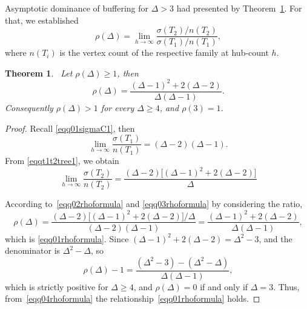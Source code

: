 \documentclass[12pt]{amsart}
\newtheorem{theorem}{Theorem}[section]
\begin{document}
\medskip




Asymptotic dominance of buffering for $\Delta>3$ had presented by Theorem~\ref{thm001bufferdominance}. For that, we established 
\begin{equation}~\label{eqqrhonm01}
\rho(\Delta) = \lim_{h\to\infty}\dfrac{\sigma(T_2)/n(T_2)}{\sigma(T_1)/n(T_1)},  
\end{equation}
where $n(T_i)$ is the vertex count of the respective family at hub-count $h$.

\begin{theorem}~\label{thm001bufferdominance}
Let $\rho(\Delta)\geqslant 1$, then
\begin{equation}~\label{eqq01rhoformula}
\rho(\Delta)=\frac{(\Delta-1)^2+2(\Delta-2)}{\Delta(\Delta-1)}.
\end{equation}
Consequently $\rho(\Delta)>1$ for every $\Delta\ge 4$, and $\rho(3)=1$.
\end{theorem}
\begin{proof}
Recall \eqref{eqq01sigmaC1}, then
\begin{equation}~\label{eqq02rhoformula}
 \lim_{h\to\infty}\dfrac{\sigma(T_1)}{n(T_1)}= (\Delta-2)(\Delta-1). 
\end{equation}
From \eqref{eqqt1t2tree1}, we obtain
\begin{equation}~\label{eqq03rhoformula}
 \lim_{h\to\infty}\dfrac{\sigma(T_2)}{n(T_2)}=\dfrac{(\Delta-2)\big[(\Delta-1)^2+2(\Delta-2)\big]}{\Delta} 
\end{equation}

According to~\eqref{eqq02rhoformula} and \eqref{eqq03rhoformula} by considering the ratio,
\begin{equation}~\label{eqq04rhoformula}
\rho(\Delta)=\frac{(\Delta-2)\big[(\Delta-1)^2+2(\Delta-2)\big]/\Delta}
{(\Delta-2)(\Delta-1)}=\frac{(\Delta-1)^2+2(\Delta-2)}{\Delta(\Delta-1)},
\end{equation}
which is \eqref{eqq01rhoformula}. Since $(\Delta-1)^2+2(\Delta-2) = \Delta^2-3$, and the denominator is $\Delta^2-\Delta$, so
\begin{equation}~\label{eqq01rhominus1}
\rho(\Delta)-1 = \frac{(\Delta^2-3)-(\Delta^2-\Delta)}{\Delta(\Delta-1)},
\end{equation}
which is strictly positive for $\Delta\geqslant 4$, and  $\rho(\Delta)=0$ if and only if $\Delta=3$. Thus, from~\eqref{eqq04rhoformula} the relationship~\eqref{eqq01rhoformula} holds.
\end{proof}
\end{document}
